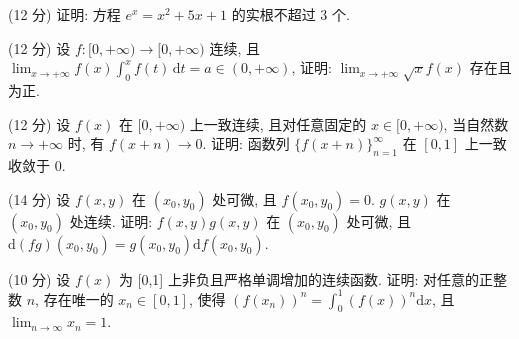 (12 分) 证明: 方程 $e^x = x^2 + 5x + 1$ 的实根不超过 3 个.\par
(12 分) 设 $f: [0, +\infty) \to [0, +\infty)$ 连续, 且 $\lim_{x \to +\infty} f(x) \int_0^x f(t) \, \mathrm{d}t = a \in (0, +\infty)$, 证明: $\lim_{x \to +\infty} \sqrt{x} f(x)$ 存在且为正.\par
(12 分) 设 $f(x)$ 在 $[0, +\infty)$ 上一致连续, 且对任意固定的 $x \in [0, +\infty)$, 当自然数 $n \to +\infty$ 时, 有 $f(x + n) \to 0$. 证明: 函数列 $\{f(x + n)\}_{n=1}^{\infty}$ 在 $[0, 1]$ 上一致收敛于 0.\par
(14 分) 设 $f(x, y)$ 在 $(x_0, y_0)$ 处可微, 且 $f(x_0, y_0) = 0$. $g(x, y)$ 在 $(x_0, y_0)$ 处连续. 证明: $f(x, y)g(x, y)$ 在 $(x_0, y_0)$ 处可微, 且 $\mathrm{d}(fg)(x_0, y_0) = g(x_0, y_0)\mathrm{d}f(x_0, y_0)$.\par
(10 分) 设 $f(x)$ 为 [0,1] 上非负且严格单调增加的连续函数. 证明: 对任意的正整数 $n$, 存在唯一的 $x_{n} \in [0,1]$, 使得 $(f(x_{n}))^{n} = \int_{0}^{1}(f(x))^{n}\mathrm{d}x$, 且 $\lim_{n\to \infty}x_n = 1$.\par
